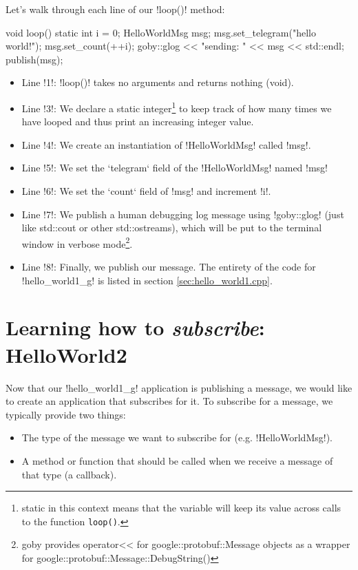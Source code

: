 Let's walk through each line of our !loop()! method:

\begin{boxedverbatim}
void loop()
{
   static int i = 0;
   HelloWorldMsg msg;
   msg.set_telegram("hello world!");
   msg.set_count(++i);
   goby::glog << "sending: " << msg << std::endl;
   publish(msg);
}
\end{boxedverbatim}
\resetbvlinenumber

\begin{itemize}
\item Line !1!: !loop()! takes no arguments and returns nothing (void). 
\item Line !3!: We declare a static integer\footnote{static in this context means that the variable will keep its value across calls to the function \texttt{loop()}.} to keep track of how many times we have looped and thus print an increasing integer value. 
\item Line !4!: We create an instantiation of !HelloWorldMsg! called !msg!.
\item Line !5!: We set the `telegram` field of the !HelloWorldMsg! named !msg!
\item Line !6!: We set the `count` field of !msg! and increment !i!.
\item Line !7!: We publish a human debugging log message using !goby::glog! (just like std::cout or other std::ostreams), which will be put to the terminal window in verbose mode\footnote{goby provides operator<< for google::protobuf::Message objects as a wrapper for google::protobuf::Message::DebugString()}. 
\item Line !8!: Finally, we publish our message. The entirety of the code for !hello_world1_g! is listed in section \ref{sec:hello_world1.cpp}.
\end{itemize}

\section{Learning how to \textit{subscribe}: HelloWorld2} \label{sec:sub_ex}

Now that our !hello_world1_g! application is publishing a message, we would like to create an application that subscribes for it. To subscribe for a message, we typically provide two things:
\begin{itemize}
\item The type of the message we want to subscribe for (e.g. !HelloWorldMsg!).
\item A method or function that should be called when we receive a message of that type (a callback).
\end{itemize}

